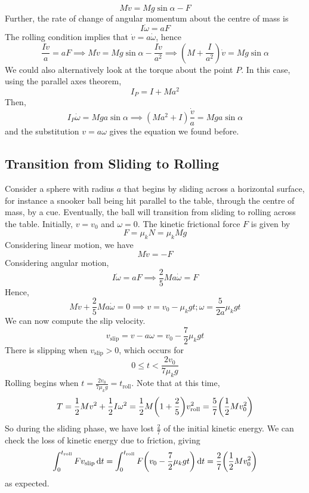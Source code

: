 \[ M\dot v = Mg\sin\alpha - F \]
Further, the rate of change of angular momentum about the centre of mass is
\[ I \dot\omega = aF \]
The rolling condition implies that $\dot v = a \dot\omega$, hence
\[ \frac{I\dot v}{a} = aF \implies M\dot v = Mg\sin\alpha - \frac{I\dot v}{a^2} \implies \left( M + \frac{I}{a^2} \right)\dot v = Mg\sin\alpha \]
We could also alternatively look at the torque about the point $P$. In this case, using the parallel axes theorem,
\[ I_P = I + Ma^2 \]
Then,
\[ I_P \dot\omega = Mga\sin\alpha \implies (M a^2 + I)\frac{\dot v}{a} = Mga\sin\alpha \]
and the substitution $v = a\omega$ gives the equation we found before.

\subsection{Transition from Sliding to Rolling}
Consider a sphere with radius $a$ that begins by sliding across a horizontal surface, for instance a snooker ball being hit parallel to the table, through the centre of mass, by a cue. Eventually, the ball will transition from sliding to rolling across the table. Initially, $v = v_0$ and $\omega = 0$. The kinetic frictional force $F$ is given by
\[ F = \mu_k N = \mu_k Mg \]
Considering linear motion, we have
\[ M \dot v = -F \]
Considering angular motion,
\[ I\dot\omega = aF \implies \frac{2}{5}Ma \dot\omega = F \]
Hence,
\[ M\dot v +\frac{2}{5}Ma \dot\omega = 0 \implies v = v_0 - \mu_k g t; \omega = \frac{5}{2a}\mu_k g t \]
We can now compute the slip velocity.
\[ v_\text{slip} = v - a\omega = v_0 - \frac{7}{2}\mu_k gt \]
There is slipping when $v_\text{slip} > 0$, which occurs for
\[ 0 \leq t < \frac{2v_0}{7\mu_k g} \]
Rolling begins when $t = \frac{2v_0}{7\mu_k g} = t_\text{roll}$. Note that at this time,
\[ T = \frac{1}{2}Mv^2 + \frac{1}{2}I\omega^2 = \frac{1}{2}M\qty(1 + \frac{2}{5})v_\text{roll}^2 = \frac{5}{7}\qty( \frac{1}{2} Mv_0^2 ) \]
So during the sliding phase, we have lost $\frac{2}{7}$ of the initial kinetic energy. We can check the loss of kinetic energy due to friction, giving
\[ \int_0^{t_\text{roll}} F v_\text{slip} \dd{t} = \int_0^{t_\text{roll}} F \qty(v_0 - \frac{7}{2}\mu_k gt) \dd{t} = \frac{2}{7}\qty(\frac{1}{2}Mv_0^2) \]
as expected.
